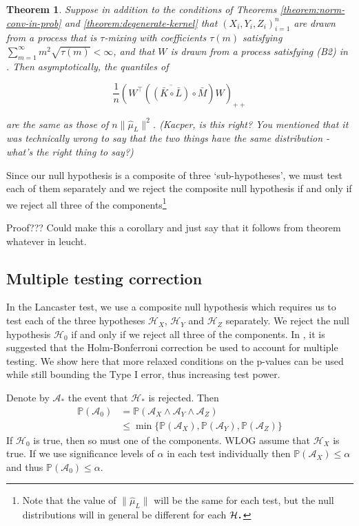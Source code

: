 \documentclass[]{article}
\newtheorem{theorem}{Theorem}
\newcommand*{\LargerCdot}{\raisebox{-0.25ex}{\scalebox{1.5}{$\cdot$}}}
\begin{document}
\begin{theorem}
Suppose in addition to the conditions of Theorems \ref{theorem:norm-conv-in-prob} and \ref{theorem:degenerate-kernel} that  $(X_i,Y_i,Z_i)_{i=1}^n$ are drawn from a process that is $\tau$-mixing with coefficients $\tau(m)$ satisfying $\sum_{m=1}^\infty m^2 \sqrt{\tau(m)} < \infty$, and that $W$ is drawn from a process satisfying (B2) in \cite{leucht2013dependent}. Then asymptotically, the quantiles of

\[\frac{1}{n}\left(W^\intercal\left( \overline{\left( \bar{K} \circ \bar{L}\right) }\circ \bar{M} \right)W\right) _{++}\]

are the same as those of $ n\| \hat \mu_L\|^2$. (Kacper, is this right? You mentioned that it was technically wrong to say that the two things have the same distribution - what's the right thing to say?)
\end{theorem}


Since our null hypothesis is a composite of three `sub-hypotheses', we must test each of them separately and we reject the composite null hypothesis if and only if we reject all three of the components\footnote{Note that the value of $\|\hat \mu_L\|$ will be the same for each test, but the null distributions will in general be different for each $\mathcal{H}_{\LargerCdot}$}


Proof??? Could make this a corollary and just say that it follows from theorem whatever in leucht.


\subsection{Multiple testing correction}
In the Lancaster test, we use a composite null hypothesis which requires us to test each of the three hypotheses $\mathcal{H}_X$, $\mathcal{H}_Y$ and $\mathcal{H}_Z$ separately. We reject the null hypothesis $\mathcal{H}_0$ if and only if we reject all three of the components. In \cite{sejdinovic2013kernel}, it is suggested that the Holm-Bonferroni \cite{holm1979simple} correction be used to account for multiple testing. We show here that more relaxed conditions on the p-values can be used while still bounding the Type I error, thus increasing test power.

Denote by $\mathcal{A}_*$ the event that $\mathcal{H}_*$ is rejected. Then
\begin{align*}
\mathbb{P}(\mathcal{A}_0) &= \mathbb{P}(\mathcal{A}_X \land \mathcal{A}_Y \land \mathcal{A}_Z) \\
&\leq \min\{\mathbb{P}(\mathcal{A}_X), \mathbb{P}(\mathcal{A}_Y), \mathbb{P}(\mathcal{A}_Z)\}
\end{align*}
If $\mathcal{H}_0$ is true, then so must one of the components. WLOG assume that $\mathcal{H}_X$ is true. If we use significance levels of $\alpha$ in each test individually then $\mathbb{P}(\mathcal{A}_X) \leq \alpha$ and thus $\mathbb{P}(\mathcal{A}_0) \leq \alpha$.
\end{document}

